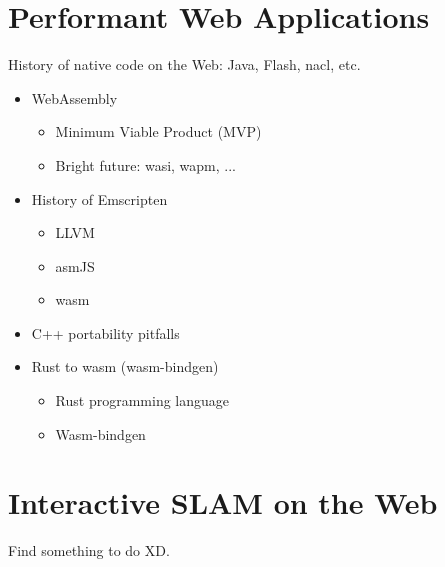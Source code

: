 \chapter{Performant Web Applications}%
\label{cha:performant_web_applications}

History of native code on the Web: Java, Flash, nacl, etc.

\begin{itemize}
	\item WebAssembly
	\begin{itemize}
		\item Minimum Viable Product (MVP)
		\item Bright future: wasi, wapm, ...
	\end{itemize}
	\item History of Emscripten
	\begin{itemize}
		\item LLVM
		\item asmJS
		\item wasm
	\end{itemize}
	\item C++ portability pitfalls
	\item Rust to wasm (wasm-bindgen)
	\begin{itemize}
		\item Rust programming language
		\item Wasm-bindgen
	\end{itemize}
\end{itemize}

\chapter{Interactive SLAM on the Web}%
\label{cha:interactive_slam_on_the_web}

Find something to do XD\@.
